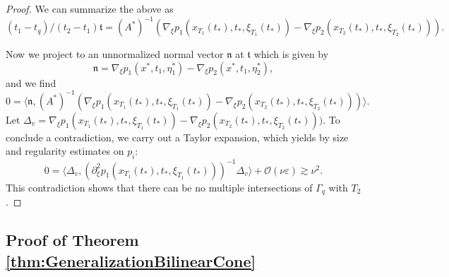 \documentclass{amsart}
\theoremstyle{definition}
\begin{document}
\begin{proof}
We can summarize the above as
\begin{equation*}
(t_1 - t_q) / (t_2 - t_1) \mathfrak{t} = (A^*)^{-1} (\nabla_{\xi} p_1(x_{T_1}(t_*),t_*,\xi_{T_1}(t_*)) - \nabla_{\xi} p_2(x_{T_2}(t_*),t_*,\xi_{T_2}(t_*))).
\end{equation*}

Now we project to an unnormalized normal vector $\mathfrak{n}$ at $\mathfrak{t}$ which is given by 
\begin{equation*}
\mathfrak{n} = \nabla_{\xi} p_1(x^*,t_1,\eta_1^*) - \nabla_{\xi} p_2(x^*,t_1,\eta_2^*),
\end{equation*}
and we find
\begin{equation*}
0 = \langle \mathfrak{n}, (A^*)^{-1} (\nabla_{\xi} p_1(x_{T_1}(t_*),t_*,\xi_{T_1}(t_*)) - \nabla_{\xi} p_2(x_{T_2}(t_*),t_*,\xi_{T_2}(t_*))) \rangle.
\end{equation*}
Let $\Delta_v = \nabla_{\xi} p_1(x_{T_1}(t_*),t_*,\xi_{T_1}(t_*)) - \nabla_{\xi} p_2(x_{T_2}(t_*),t_*,\xi_{T_2}(t_*)))$.
To conclude a contradiction, we carry out a Taylor expansion, which yields by size and regularity estimates on $p_i$:
\begin{equation*}
0 = \langle \Delta_v, (\partial^2_{\xi} p_1(x_{T_1}(t_*),t_*,\xi_{T_1}(t_*)))^{-1} \Delta_v \rangle + \mathcal{O}(\nu \varepsilon) \gtrsim \nu^2.
\end{equation*}
This contradiction shows that there can be no multiple intersections of $\Gamma_q$ with $T_2$.
\end{proof}

\subsection{Proof of Theorem \ref{thm:GeneralizationBilinearCone}}
\end{document}
